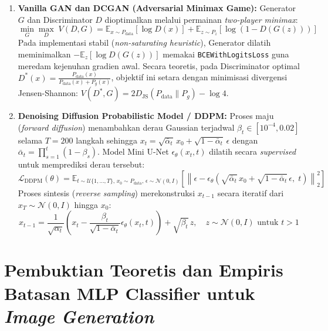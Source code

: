 \documentclass[11pt,a4paper]{article}
\begin{document}
\begin{enumerate}[leftmargin=1.4em, itemsep=3pt]
  \item \textbf{Vanilla GAN dan DCGAN (Adversarial Minimax Game):} Generator $G$ dan Discriminator $D$ dioptimalkan melalui permainan \textit{two-player minimax}:
  \begin{equation}
    \min_{G}\max_{D}\; V(D, G) = \mathbb{E}_{x \sim P_{\text{data}}}\!\left[\log D(x)\right] + \mathbb{E}_{z \sim P_z}\!\left[\log(1 - D(G(z)))\right]
  \end{equation}
  Pada implementasi stabil (\textit{non-saturating heuristic}), Generator dilatih meminimalkan $-\mathbb{E}_{z}[\log D(G(z))]$ memakai \texttt{BCEWithLogitsLoss} guna meredam kejenuhan gradien awal. Secara teoretis, pada Discriminator optimal $D^*(x) = \frac{P_{\text{data}}(x)}{P_{\text{data}}(x) + P_g(x)}$, objektif ini setara dengan minimisasi divergensi Jensen-Shannon: $V(D^*, G) = 2 D_{\text{JS}}(P_{\text{data}} \| P_g) - \log 4$.

  \item \textbf{Denoising Diffusion Probabilistic Model / DDPM:} Proses maju (\textit{forward diffusion}) menambahkan derau Gaussian terjadwal $\beta_t \in [10^{-4}, 0.02]$ selama $T=200$ langkah sehingga $x_t = \sqrt{\bar{\alpha}_t}\,x_0 + \sqrt{1 - \bar{\alpha}_t}\,\epsilon$ dengan $\bar{\alpha}_t = \prod_{s=1}^t (1 - \beta_s)$. Model Mini U-Net $\epsilon_\theta(x_t, t)$ dilatih secara \textit{supervised} untuk memprediksi derau tersebut:
  \begin{equation}
    \mathcal{L}_{\text{DDPM}}(\theta) = \mathbb{E}_{t \sim \mathcal{U}\{1,\dots,T\},\, x_0 \sim P_{\text{data}},\, \epsilon \sim \mathcal{N}(0, I)} \left[ \left\| \epsilon - \epsilon_\theta\!\left(\sqrt{\bar{\alpha}_t}\,x_0 + \sqrt{1-\bar{\alpha}_t}\,\epsilon,\; t\right) \right\|_2^2 \right]
  \end{equation}
  Proses sintesis (\textit{reverse sampling}) merekonstruksi $x_{t-1}$ secara iteratif dari $x_T \sim \mathcal{N}(0, I)$ hingga $x_0$:
  \begin{equation}
    x_{t-1} = \frac{1}{\sqrt{\alpha_t}}\left(x_t - \frac{\beta_t}{\sqrt{1 - \bar{\alpha}_t}}\epsilon_\theta(x_t, t)\right) + \sqrt{\beta_t}\,z, \quad z \sim \mathcal{N}(0, I) \text{ untuk } t > 1
  \end{equation}
\end{enumerate}

\section{Pembuktian Teoretis dan Empiris Batasan MLP Classifier untuk \textit{Image Generation}}
\label{sec:mlp_proof}
\end{document}
